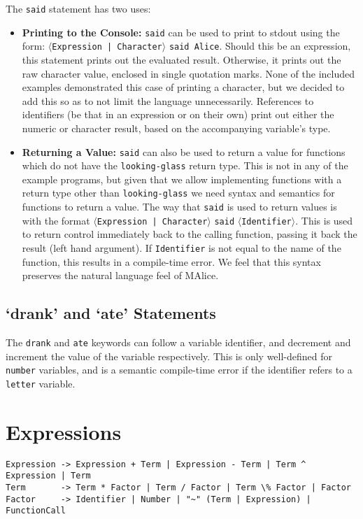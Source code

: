 \documentclass[a4wide, 11pt]{article}
\begin{document}
The \texttt{said} statement has two uses:
\begin{itemize}
\item \textbf{Printing to the Console:} \texttt{said} can be used to print to stdout using the form: $\langle$\texttt{Expression | Character}$\rangle$ \texttt{said Alice}. Should this be an expression, this statement prints out the evaluated result. Otherwise, it prints out the raw character value, enclosed in single quotation marks. None of the included examples demonstrated this case of printing a character, but we decided to add this so as to not limit the language unnecessarily. References to identifiers (be that in an expression or on their own) print out either the numeric or character result, based on the accompanying variable's type.
\item \textbf{Returning a Value:} \texttt{said} can also be used to return a value for functions which do not have the \texttt{looking-glass} return type. This is not in any of the example programs, but given that we allow implementing functions with a return type other than \texttt{looking-glass} we need syntax and semantics for functions to return a value. The way that \texttt{said} is used to return values is with the format $\langle$\texttt{Expression | Character}$\rangle$ \texttt{said} $\langle$\texttt{Identifier}$\rangle$. This is used to return control immediately back to the calling function, passing it back the result (left hand argument). If \texttt{Identifier} is not equal to the name of the function, this results in a compile-time error. We feel that this syntax preserves the natural language feel of MAlice.
\end{itemize}

\subsection{`drank' and `ate' Statements}

The \texttt{drank} and \texttt{ate} keywords can follow a variable identifier, and decrement and increment the value of the variable respectively. This is only well-defined for \texttt{number} variables, and is a semantic compile-time error if the identifier refers to a \texttt{letter} variable.
  
\section{Expressions}

\begin{verbatim}
Expression -> Expression + Term | Expression - Term | Term ^ Expression | Term
Term       -> Term * Factor | Term / Factor | Term \% Factor | Factor
Factor     -> Identifier | Number | "~" (Term | Expression) | FunctionCall

\end{verbatim}
\end{document}
